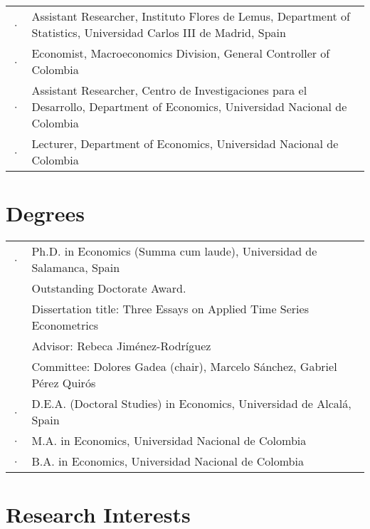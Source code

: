 \documentclass[11pt]{article}\usepackage[]{graphicx}\usepackage[]{color}
\begin{document}
\begin{tabular}{R{0.1cm} L{14cm}}

· &  Assistant Researcher, Instituto Flores de Lemus, Department of Statistics, Universidad Carlos III de Madrid, Spain \\[.1cm]

· & Economist, Macroeconomics Division, General Controller of Colombia \\[.1cm]

· & Assistant Researcher, Centro de Investigaciones para el Desarrollo, Department of Economics, Universidad Nacional de Colombia \\[.1cm]

· & Lecturer, Department of Economics, Universidad Nacional de Colombia \\

\end{tabular}

\section{Degrees} 

\begin{tabular}{R{0.1cm} L{14cm}}

· & Ph.D. in Economics (Summa cum laude), Universidad de Salamanca, Spain\\
  & Outstanding Doctorate Award.\\
  & Dissertation title: Three Essays on Applied Time Series Econometrics\\
  & Advisor: Rebeca Jiménez-Rodríguez\\
  & Committee: Dolores Gadea (chair), Marcelo Sánchez, Gabriel Pérez Quirós\\[.3cm]

· & D.E.A. (Doctoral Studies) in Economics, Universidad de Alcalá, Spain\\

· & M.A. in Economics, Universidad Nacional de Colombia\\

· & B.A. in Economics, Universidad Nacional de Colombia\\

\end{tabular}

\section{Research Interests}
\end{document}
